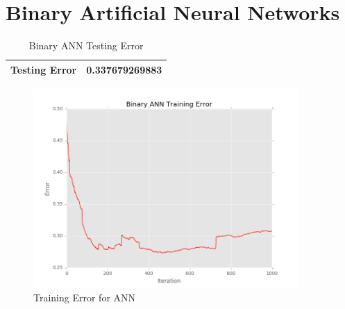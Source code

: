 \documentclass[12pt]{article}
\begin{document}
\maketitle

\section{Binary Artificial Neural Networks}\label{Binary ANN}
\begin{table}[h]
\begin{center}
\begin{tabular}{|l|l|}
\hline
Testing Error & 0.337679269883\\
\hline
\end{tabular}
\caption{Binary ANN Testing Error}
\end{center}
\end{table}

\begin{figure}[H]
\begin{center}
\includegraphics[width=0.9\textwidth]{binary_ann_training_errors.png}
\caption{Training Error for ANN}
\end{center}
\end{figure}

\newpage
\end{document}
